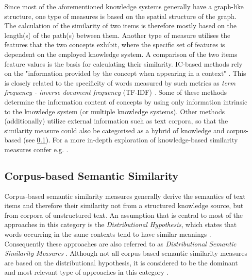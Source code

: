 \documentclass[11pt, numbers=noenddot]{scrreprt}
\let\citef\cite  %
\let\cite\parencite  %
\begin{document}
Since most of the aforementioned knowledge systems generally have a graph-like structure, one type of measures is based on the spatial structure of the graph. The calculation of the similarity of two items is therefore mostly based on the length(s) of the path(s) between them. Another type of measure  utilises the features that the two concepts exhibit, where the specific set of features is dependent on the employed knowledge system. A comparison of the two items feature values is the basis for calculating their similarity. IC-based methods rely on the "information provided by the concept when appearing in a context" \cite{sanchezSemanticSimilarityMethod2013}. This is closely related to the specificity of words measured by such metrics as \textit{term frequency - inverse document frequency} (TF-IDF) \cite{aizawaInformationtheoreticPerspectiveTf2003}. Some of these methods determine the information content of concepts by using only information intrinsic to the knowledge system (or multiple knowledge systems). Other methods (additionally) utilize external information such as text corpora, so that the similarity measure could also be categorised as a hybrid of knowledge and corpus-based (see \cref{sec:corpus-based-semantic-similarity}). For a more in-depth exploration of knowledge-based similarity measures confer e.g. \citef{chandrasekaranEvolutionSemanticSimilarity2021, harispeSemanticSimilarityNatural2015, zhuComputingSemanticSimilarity2017, mihalceaCorpusbasedKnowledgebasedMeasures2006}.



\subsection{Corpus-based Semantic Similarity}
\label{sec:corpus-based-semantic-similarity}
Corpus-based semantic similarity measures generally derive the semantics of text items and therefore their similarity not from a structured knowledge source, but from corpora of unstructured text. An assumption that is central to most of the approaches in this category is the \textit{Distributional Hypothesis}, which states that words occurring in the same contexts tend to have similar meanings \cite{harrisDistributionalStructure1954}. Consequently these approaches are also referred to as \textit{Distributional Semantic Similarity Measures} \cite{mohammadDistributionalMeasuresSemantic2012}. Although not all corpus-based semantic similarity measures are based on the distributional hypothesis, it is considered to be the dominant and most relevant type of approaches in this category \cite[Section 2.4]{harispeSemanticSimilarityNatural2015}.
\end{document}
